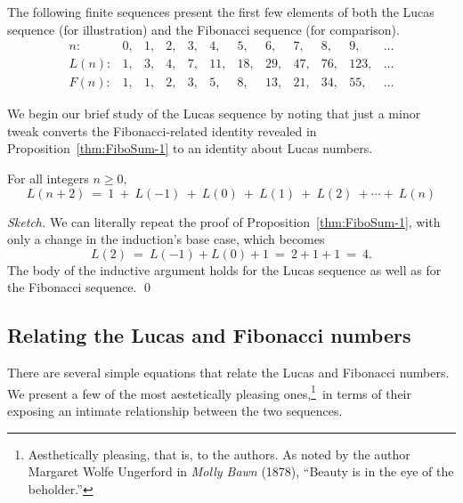 \medskip

The following finite sequences present the first few elements of both
the Lucas sequence (for illustration) and the Fibonacci sequence
(for comparison).
\[
\begin{array}{r|rrrrrrrrrrr}
n: &
 0, & 1, & 2, & 3, &  4, &  5, &  6, &  7, &  8, &   9, & \ldots \\
\hline
L(n): &
 1, & 3, & 4, & 7, & 11, & 18, & 29, & 47, & 76, & 123, & \ldots \\
F(n): &
 1, & 1, & 2, & 3, &  5, &  8, & 13, & 21, & 34, &  55, & \ldots
\end{array}
\]

We begin our  brief study of the Lucas sequence by noting that just a
minor tweak converts the Fibonacci-related identity revealed in
Proposition~\ref{thm:FiboSum-1} to an identity about Lucas numbers.

\begin{prop}
\label{thm:LucasSum-1}
For all integers $n \geq 0$,
\begin{equation}
\label{eq:multilinear-Lucas-1}
L(n+2) \ = \
1 \ + \ L(-1) \ + \ L(0) \ + \ L(1) \ + \ L(2) \ + \cdots + \ L(n)
\end{equation}
\end{prop}

\begin{proof}[Sketch]
We can literally repeat the proof of Proposition~\ref{thm:FiboSum-1},
with only a change in the induction's base case, which becomes
\[ L(2) \ = \ L(-1) + L(0) + 1 \ = \ 2 + 1 + 1 \ = \ 4. \]
The body of the inductive argument holds for the Lucas sequence as
well as for the Fibonacci sequence.
\qed
\end{proof}

\subsection{Relating the Lucas and Fibonacci numbers}

There are several simple equations that relate the Lucas and Fibonacci
numbers.  We present a few of the most aestetically pleasing
ones,\footnote{Aesthetically pleasing, that is, to the authors.  As
  noted by the author Margaret Wolfe Ungerford in {\it Molly Bawn}
  (1878),\index{Ungerford, Margaret Wolfe} ``Beauty is in the eye of
  the beholder.''}~in terms of their exposing an intimate
relationship between the two sequences.

